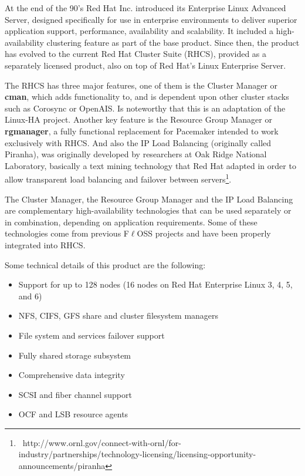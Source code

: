 \documentclass[a4paper, 12pt]{book}
\begin{document}
At the end of the 90's Red Hat Inc. introduced its Enterprise Linux Advanced Server, designed specifically for use in enterprise environments to deliver superior application support, performance, availability and scalability. It included a high-availability clustering feature as part of the base product. Since then, the product has evolved to the current Red Hat Cluster Suite (RHCS), provided as a separately licensed product, also on top of Red Hat's Linux Enterprise Server.\bigskip

\noindent The RHCS has three major features, one of them is the Cluster Manager or \textbf{cman}, which adds functionality to, and is dependent upon other cluster stacks such as Corosync or OpenAIS. Is noteworthy that this is an adaptation of the Linux-HA project. Another key feature is the Resource Group Manager or \textbf{rgmanager}, a fully functional replacement for Pacemaker intended to work exclusively with RHCS. And also the IP Load Balancing (originally called Piranha), was originally developed by researchers at Oak Ridge National Laboratory, basically a text mining technology that Red Hat adapted in order to allow transparent load balancing and failover between servers\footnote{{\tiny\ http://www.ornl.gov/connect-with-ornl/for-industry/partnerships/technology-licensing/licensing-opportunity-announcements/piranha}}.\bigskip

\noindent The Cluster Manager, the Resource Group Manager and the IP Load Balancing are complementary high-availability technologies that can be used separately or in combination, depending on application requirements. Some of these technologies come from previous F$\ell$OSS projects and have been properly integrated into RHCS.\bigskip

\noindent Some technical details of this product are the following:

\begin{itemize}
	\item Support for up to 128 nodes (16 nodes on Red Hat Enterprise Linux 3, 4, 5, and 6)
	\item NFS, CIFS, GFS share and cluster filesystem managers
	\item File system and services failover support
	\item Fully shared storage subsystem
	\item Comprehensive data integrity
	\item SCSI and fiber channel support
	\item OCF and LSB resource agents
\end{itemize}
\end{document}
